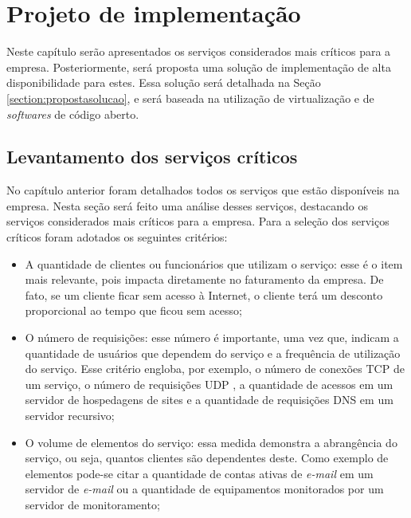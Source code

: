 \chapter{Projeto de implementação}
\label{cap:projetoimplementacao}

Neste capítulo serão apresentados os serviços considerados mais críticos para a empresa. Posteriormente, será proposta uma solução de implementação 
de alta disponibilidade para estes. Essa solução será detalhada na Seção \ref{section:propostasolucao}, e será baseada na utilização de 
virtualização e de \textit{softwares} de código aberto. 

\section{Levantamento dos serviços críticos}
\label{section:servcrit}

No capítulo anterior foram detalhados todos os serviços que estão disponíveis na empresa. Nesta seção será feito uma análise desses
serviços, destacando os serviços considerados mais críticos para a empresa. Para a seleção dos serviços críticos foram adotados os seguintes
critérios:
\begin{itemize}
 \item A quantidade de clientes ou funcionários que utilizam o serviço: esse é o item mais relevante, pois impacta diretamente no faturamento
 da empresa. De fato, se um cliente ficar sem acesso à Internet, o cliente terá um desconto proporcional ao tempo que ficou sem 
 acesso; 
 \item O número de requisições: esse número é importante, uma vez que, indicam a quantidade de usuários que dependem do serviço e a frequência
 de utilização do serviço. Esse critério engloba, por exemplo, o número de conexões \ac{TCP} \cite{tanenbaum2011} de um serviço, o número de 
 requisições \ac{UDP} \cite{tanenbaum2011}, a quantidade de acessos em um servidor de hospedagens de sites e a quantidade de requisições \ac{DNS} 
 em um servidor recursivo;
 \item O volume de elementos do serviço: essa medida demonstra a abrangência do serviço, ou seja, quantos clientes são dependentes deste. 
 Como exemplo de elementos pode-se citar a quantidade de contas ativas de \textit{e-mail} em um servidor de \textit{e-mail} ou a quantidade de 
 equipamentos monitorados por um servidor de monitoramento;
\end{itemize}

